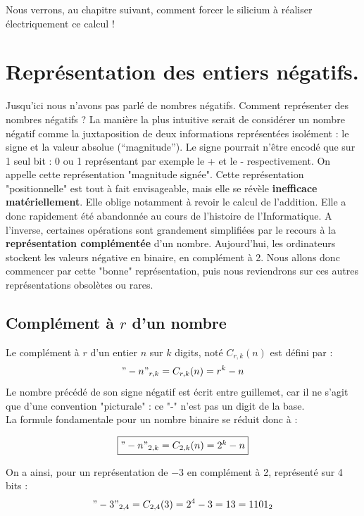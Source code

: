 Nous verrons, au chapitre suivant, comment forcer le silicium à réaliser électriquement ce calcul !






\section{Représentation des entiers négatifs.}

Jusqu'ici nous n'avons pas parlé de nombres négatifs. Comment représenter des nombres négatifs ? La manière la plus intuitive serait de considérer un nombre négatif comme la juxtaposition de deux informations représentées isolément :
le signe et la valeur absolue (``magnitude'').
Le signe pourrait n'être encodé que sur 1 seul bit : 0 ou 1 représentant par exemple le + et le - respectivement.
On appelle cette représentation "magnitude signée". Cette représentation "positionnelle" est tout à fait envisageable,
mais elle se révèle \textbf{inefficace matériellement}.
Elle oblige notamment à revoir le calcul de l'addition.
Elle a donc rapidement été abandonnée au cours de l'histoire de l'Informatique.
A l'inverse, certaines opérations sont grandement simplifiées par le recours à la \textbf{représentation complémentée} d'un nombre.
Aujourd'hui, les ordinateurs stockent les valeurs négative en binaire, en complément à 2.
Nous allons donc commencer par cette "bonne" représentation, puis nous reviendrons sur ces autres représentations obsolètes ou rares.

\subsection{Complément à $r$ d'un nombre}
Le complément à $r$ d'un entier $n$ sur $k$ digits, noté $C_{r,k}(n)$ est défini par :
$$"-n"_{r,k}=C_{r,k}(n)=r^k-n$$
Le nombre précédé de son signe négatif est écrit entre guillemet, car il ne s'agit que d'une convention "picturale" :
ce "-" n'est pas un digit de la base.\\

La formule fondamentale pour un nombre binaire se réduit donc à :

\begin{equation}
  \boxed{$$"-n"_{2,k}=C_{2,k}(n)=2^k-n$$}
\end{equation}

On a ainsi, pour un représentation de $-3$ en complément à 2, représenté sur 4 bits :
$$"-3"_{2,4}=C_{2,4}(3)=2^4-3=13=1101_2$$

